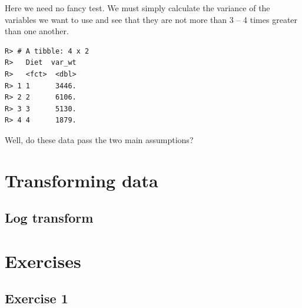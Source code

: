 \documentclass[english,10pt,a4paper,oneside]{book}
\newenvironment{Shaded}{\begin{snugshade}}{\end{snugshade}}
\newcommand{\DataTypeTok}[1]{\textcolor[rgb]{0.13,0.29,0.53}{#1}}
\newcommand{\DecValTok}[1]{\textcolor[rgb]{0.00,0.00,0.81}{#1}}
\newcommand{\KeywordTok}[1]{\textcolor[rgb]{0.13,0.29,0.53}{\textbf{#1}}}
\newcommand{\NormalTok}[1]{#1}
\newcommand{\OperatorTok}[1]{\textcolor[rgb]{0.81,0.36,0.00}{\textbf{#1}}}
\newcommand{\StringTok}[1]{\textcolor[rgb]{0.31,0.60,0.02}{#1}}
\theoremstyle{definition}
\theoremstyle{definition}
\theoremstyle{definition}
\theoremstyle{remark}
\begin{document}
Here we need no fancy test. We must simply calculate the variance of the
variables we want to use and see that they are not more than 3 -- 4
times greater than one another.

\begin{Shaded}
\end{Shaded}

\begin{verbatim}
R> # A tibble: 4 x 2
R>   Diet  var_wt
R>   <fct>  <dbl>
R> 1 1      3446.
R> 2 2      6106.
R> 3 3      5130.
R> 4 4      1879.
\end{verbatim}

Well, do these data pass the two main assumptions?

\hypertarget{transforming-data}{%
\section{Transforming data}\label{transforming-data}}

\hypertarget{log-transform}{%
\subsection{Log transform}\label{log-transform}}

\hypertarget{section}{%
\subsection{}\label{section}}

\hypertarget{exercises-6}{%
\section{Exercises}\label{exercises-6}}

\hypertarget{exercise-1-6}{%
\subsection{Exercise 1}\label{exercise-1-6}}
\end{document}

